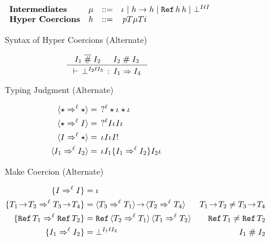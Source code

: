 \documentclass[acmtog, authorversion, acmlarge]{acmart}
\begin{document}
\begin{figure}[tbh]
  \centering
  \begin{subfigure}{.5\textwidth}
    \[
    \begin{array}{llcl}
      \textbf{Intermediates}&
      \Med  & ::= & \id \mid \fn{\HC}{\HC} \mid \rf{\HC}{\HC} %
                  \mid \failed{\I}{\Lbl}{\I}\\
      \textbf{Hyper Coercions}&
      \HC   & ::= & \hc{\Prj}{\T}{\Med}{\T}{\Inj}
    \end{array}
    \]
    \caption{Syntax of Hyper Coercions (Alternate)}
    \label{fig:CompilerhcSyntax}
  \end{subfigure}%
  \begin{subfigure}{.5\textwidth}
    \begin{gather*}
      \inference{\I_1 \sct \I_2 & \I_2 \sic \I_3}
                {\cwt{\failed{\I_2}{\Lbl}{\I_3}}{\I_1}{\I_4}}
    \end{gather*}
    \caption{Typing Judgment (Alternate)}
    \label{fig:CompilerTyping}
  \end{subfigure}
  \begin{subfigure}{.35\textwidth}
    \begin{align*}
      \langle \star \Rightarrow^{\ell} \star \rangle &= \; \,  ?^{\ell} \star \iota_{} \star \iota_{} \,\\
      \langle \star \Rightarrow^{\ell} I \rangle   &= \; \,  ?^{\ell} I \iota_{} I \iota_{} \, \\
      \langle I \Rightarrow^{\ell} \star \rangle   &= \, \iota_{} I \iota_{} I  ! \, \\
      \langle I_1 \Rightarrow^{\ell} I_2 \rangle &= \, \iota_{} I_1 \{ I_1 \Rightarrow^{\ell} I_2 \} I_2 \iota_{} \,
    \end{align*}
    \caption{Make Coercion (Alternate)}
    \label{fig:makeCoercion}
  \end{subfigure}%
  \begin{subfigure}{.65\textwidth}
    \begin{align*}
      \mkIcrcn{\I}{\I}   &= \id\\
      \mkIcrcn{\Fn[\!]{\T_{1}}{\T_{2}}}{\Fn[\!]{\T_{3}}{\T_{4}}} %
      &= \fn[\!]{\mkcrcn{\T_{3}}{\T_{1}}}{\mkcrcn{\T_{2}}{\T_{4}}}
      & \Fn[\!]{\T_{1}}{\T_{2}} \neq \Fn[\!]{\T_{3}}{\T_{4}} \\
      \mkIcrcn{\Ref{\T_1}}{\Ref{\T_2}} %
      &= \rf{\mkcrcn{\T_{2}}{\T_{1}}}{\mkcrcn{\T_{1}}{\T_{2}}} %
      & \Ref{\T_1} \neq \Ref{\T_2} \\
      \mkIcrcn{\I_1}{\I_2} &= \failed{\I_1}{\Lbl}{\I_2} %
      & \I_1 \sic \I_2

\end{align*}
\end{subfigure}
\end{figure}
\end{document}
